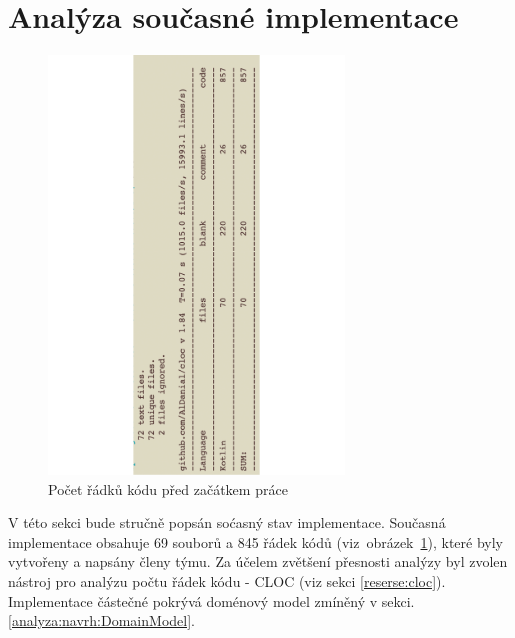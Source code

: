 \section{Analýza současné implementace}\label{analyza:soucasnaImplementace}
    \begin{figure}\centering
	   \includegraphics[angle=-90, width=0.7\textwidth]{pdfs/Cloc1}
	   \caption[Počet řádků kódu před začátkem práce]{Počet řádků kódu před začátkem práce}\label{image:cloc1}
    \end{figure}
     V této sekci bude stručně popsán soćasný stav implementace. Současná implementace obsahuje 69 souborů a 845 řádek kódů (viz~obrázek~\ref{image:cloc1}), které byly vytvořeny a napsány členy týmu. Za účelem zvětšení přesnosti analýzy byl zvolen nástroj pro analýzu počtu řádek kódu - CLOC (viz sekci \ref{reserse:cloc}). Implementace částečné pokrývá doménový model zmíněný v sekci. \ref{analyza:navrh:DomainModel}.
        
